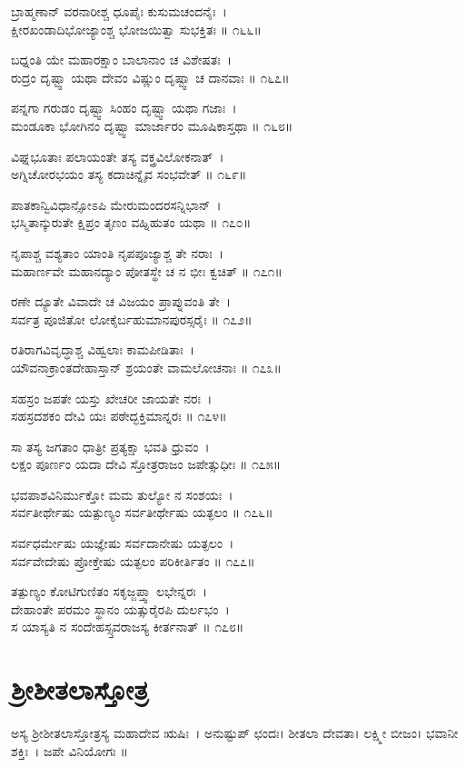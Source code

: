 ಬ್ರಾಹ್ಮಣಾನ್ ವರನಾರೀಶ್ಚ ಧೂಪೈಃ ಕುಸುಮಚಂದನೈಃ~।\\
ಕ್ಷೀರಖಂಡಾದಿಭೋಜ್ಯಾಂಶ್ಚ ಭೋಜಯಿತ್ವಾ ಸುಭಕ್ತಿತಃ ॥ ೧೬೬॥

ಬಧ್ನಂತಿ ಯೇ ಮಹಾರಕ್ಷಾಂ ಬಾಲಾನಾಂ ಚ ವಿಶೇಷತಃ~।\\
ರುದ್ರಂ ದೃಷ್ಟ್ವಾ ಯಥಾ ದೇವಂ ವಿಷ್ಣುಂ ದೃಷ್ಟ್ವಾ ಚ ದಾನವಾಃ ॥ ೧೬೭॥

ಪನ್ನಗಾ ಗರುಡಂ ದೃಷ್ಟ್ವಾ ಸಿಂಹಂ ದೃಷ್ಟ್ವಾ ಯಥಾ ಗಜಾಃ~।\\
ಮಂಡೂಕಾ ಭೋಗಿನಂ ದೃಷ್ಟ್ವಾ ಮಾರ್ಜಾರಂ ಮೂಷಿಕಾಸ್ತಥಾ ॥ ೧೬೮॥

ವಿಘ್ನಭೂತಾಃ ಪಲಾಯಂತೇ ತಸ್ಯ ವಕ್ತ್ರವಿಲೋಕನಾತ್~।\\
ಅಗ್ನಿಚೋರಭಯಂ ತಸ್ಯ ಕದಾಚಿನ್ನೈವ ಸಂಭವೇತ್ ॥ ೧೬೯॥

ಪಾತಕಾನ್ವಿವಿಧಾನ್ಸೋಽಪಿ ಮೇರುಮಂದರಸನ್ನಿಭಾನ್~।\\
ಭಸ್ಮಿತಾನ್ಕುರುತೇ ಕ್ಷಿಪ್ರಂ ತೃಣಂ ವಹ್ನಿಹುತಂ ಯಥಾ ॥ ೧೭೦॥

ನೃಪಾಶ್ಚ ವಶ್ಯತಾಂ ಯಾಂತಿ ನೃಪಪೂಜ್ಯಾಶ್ಚ ತೇ ನರಾಃ~।\\
ಮಹಾರ್ಣವೇ ಮಹಾನದ್ಯಾಂ ಪೋತಸ್ಥೇ ಚ ನ ಭೀಃ ಕ್ವಚಿತ್ ॥ ೧೭೧॥

ರಣೇ ದ್ಯೂತೇ ವಿವಾದೇ ಚ ವಿಜಯಂ ಪ್ರಾಪ್ನುವಂತಿ ತೇ~।\\
ಸರ್ವತ್ರ ಪೂಜಿತೋ ಲೋಕೈರ್ಬಹುಮಾನಪುರಸ್ಸರೈಃ ॥ ೧೭೨॥

ರತಿರಾಗವಿವೃದ್ಧಾಶ್ಚ ವಿಹ್ವಲಾಃ ಕಾಮಪೀಡಿತಾಃ~।\\
ಯೌವನಾಕ್ರಾಂತದೇಹಾಸ್ತಾನ್ ಶ್ರಯಂತೇ ವಾಮಲೋಚನಾಃ ॥ ೧೭೩॥

ಸಹಸ್ರಂ ಜಪತೇ ಯಸ್ತು ಖೇಚರೀ ಜಾಯತೇ ನರಃ~।\\
ಸಹಸ್ರದಶಕಂ ದೇವಿ ಯಃ ಪಠೇದ್ಭಕ್ತಿಮಾನ್ನರಃ ॥ ೧೭೪॥

ಸಾ ತಸ್ಯ ಜಗತಾಂ ಧಾತ್ರೀ ಪ್ರತ್ಯಕ್ಷಾ ಭವತಿ ಧ್ರುವಂ~।\\
ಲಕ್ಷಂ ಪೂರ್ಣಂ ಯದಾ ದೇವಿ ಸ್ತೋತ್ರರಾಜಂ ಜಪೇತ್ಸುಧೀಃ ॥ ೧೭೫॥

ಭವಪಾಶವಿನಿರ್ಮುಕ್ತೋ ಮಮ ತುಲ್ಯೋ ನ ಸಂಶಯಃ~।\\
ಸರ್ವತೀರ್ಥೇಷು ಯತ್ಪುಣ್ಯಂ ಸರ್ವತೀರ್ಥೇಷು ಯತ್ಫಲಂ ॥ ೧೭೬॥

ಸರ್ವಧರ್ಮೇಷು ಯಜ್ಞೇಷು ಸರ್ವದಾನೇಷು ಯತ್ಫಲಂ~।\\
ಸರ್ವವೇದೇಷು ಪ್ರೋಕ್ತೇಷು ಯತ್ಫಲಂ ಪರಿಕೀರ್ತಿತಂ ॥ ೧೭೭॥

ತತ್ಪುಣ್ಯಂ ಕೋಟಿಗುಣಿತಂ ಸಕೃಜ್ಜಪ್ತ್ವಾ ಲಭೇನ್ನರಃ~।\\
ದೇಹಾಂತೇ ಪರಮಂ ಸ್ಥಾನಂ ಯತ್ಸುರೈರಪಿ ದುರ್ಲಭಂ~।\\
ಸ ಯಾಸ್ಯತಿ ನ ಸಂದೇಹಸ್ಸ್ತವರಾಜಸ್ಯ ಕೀರ್ತನಾತ್ ॥ ೧೭೮॥
\section{ಶ್ರೀಶೀತಲಾಸ್ತೋತ್ರ}
ಅಸ್ಯ ಶ್ರೀಶೀತಲಾಸ್ತೋತ್ರಸ್ಯ ಮಹಾದೇವ ಋಷಿಃ~। ಅನುಷ್ಟುಪ್ ಛಂದಃ। ಶೀತಲಾ ದೇವತಾ। ಲಕ್ಷ್ಮೀ ಬೀಜಂ। ಭವಾನೀ ಶಕ್ತಿಃ~। ಜಪೇ ವಿನಿಯೋಗಃ ॥

